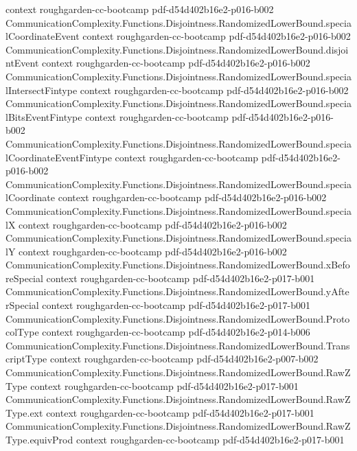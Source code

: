\begin{theorem}
  {context}
  {roughgarden-cc-bootcamp}
  {pdf-d54d402b16e2-p016-b002}
\proofstep
  {CommunicationComplexity.Functions.Disjointness.RandomizedLowerBound.specialCoordinateEvent}
  {context}
  {roughgarden-cc-bootcamp}
  {pdf-d54d402b16e2-p016-b002}
\proofstep
  {CommunicationComplexity.Functions.Disjointness.RandomizedLowerBound.disjointEvent}
  {context}
  {roughgarden-cc-bootcamp}
  {pdf-d54d402b16e2-p016-b002}
\proofstep
  {CommunicationComplexity.Functions.Disjointness.RandomizedLowerBound.specialIntersectFintype}
  {context}
  {roughgarden-cc-bootcamp}
  {pdf-d54d402b16e2-p016-b002}
\proofstep
  {CommunicationComplexity.Functions.Disjointness.RandomizedLowerBound.specialBitsEventFintype}
  {context}
  {roughgarden-cc-bootcamp}
  {pdf-d54d402b16e2-p016-b002}
\proofstep
  {CommunicationComplexity.Functions.Disjointness.RandomizedLowerBound.specialCoordinateEventFintype}
  {context}
  {roughgarden-cc-bootcamp}
  {pdf-d54d402b16e2-p016-b002}
\proofstep
  {CommunicationComplexity.Functions.Disjointness.RandomizedLowerBound.specialCoordinate}
  {context}
  {roughgarden-cc-bootcamp}
  {pdf-d54d402b16e2-p016-b002}
\proofstep
  {CommunicationComplexity.Functions.Disjointness.RandomizedLowerBound.specialX}
  {context}
  {roughgarden-cc-bootcamp}
  {pdf-d54d402b16e2-p016-b002}
\proofstep
  {CommunicationComplexity.Functions.Disjointness.RandomizedLowerBound.specialY}
  {context}
  {roughgarden-cc-bootcamp}
  {pdf-d54d402b16e2-p016-b002}
\proofstep
  {CommunicationComplexity.Functions.Disjointness.RandomizedLowerBound.xBeforeSpecial}
  {context}
  {roughgarden-cc-bootcamp}
  {pdf-d54d402b16e2-p017-b001}
\proofstep
  {CommunicationComplexity.Functions.Disjointness.RandomizedLowerBound.yAfterSpecial}
  {context}
  {roughgarden-cc-bootcamp}
  {pdf-d54d402b16e2-p017-b001}
\proofstep
  {CommunicationComplexity.Functions.Disjointness.RandomizedLowerBound.ProtocolType}
  {context}
  {roughgarden-cc-bootcamp}
  {pdf-d54d402b16e2-p014-b006}
\proofstep
  {CommunicationComplexity.Functions.Disjointness.RandomizedLowerBound.TranscriptType}
  {context}
  {roughgarden-cc-bootcamp}
  {pdf-d54d402b16e2-p007-b002}
\proofstep
  {CommunicationComplexity.Functions.Disjointness.RandomizedLowerBound.RawZType}
  {context}
  {roughgarden-cc-bootcamp}
  {pdf-d54d402b16e2-p017-b001}
\proofstep
  {CommunicationComplexity.Functions.Disjointness.RandomizedLowerBound.RawZType.ext}
  {context}
  {roughgarden-cc-bootcamp}
  {pdf-d54d402b16e2-p017-b001}
\proofstep
  {CommunicationComplexity.Functions.Disjointness.RandomizedLowerBound.RawZType.equivProd}
  {context}
  {roughgarden-cc-bootcamp}
  {pdf-d54d402b16e2-p017-b001}

\end{theorem}
